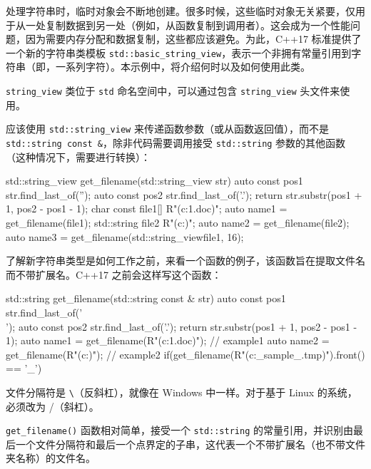 

处理字符串时，临时对象会不断地创建。很多时候，这些临时对象无关紧要，仅用于从一处复制数据到另一处（例如，从函数复制到调用者）。这会成为一个性能问题，因为需要内存分配和数据复制，这些都应该避免。为此，C++17 标准提供了一个新的字符串类模板 \verb|std::basic_string_view|，表示一个非拥有常量引用到字符串（即，一系列字符）。本示例中，将介绍何时以及如何使用此类。


\verb|string_view| 类位于 \verb|std| 命名空间中，可以通过包含 \verb|string_view| 头文件来使用。


应该使用 \verb|std::string_view| 来传递函数参数（或从函数返回值），而不是 \verb|std::string const &|，除非代码需要调用接受 \verb|std::string| 参数的其他函数（这种情况下，需要进行转换）：

\begin{cpp}
std::string_view get_filename(std::string_view str)
{
    auto const pos1 {str.find_last_of('')};
    auto const pos2 {str.find_last_of('.')};
    return str.substr(pos1 + 1, pos2 - pos1 - 1);
}
char const file1[] {R"(c:\test\example1.doc)"};
auto name1 = get_filename(file1);
std::string file2 {R"(c:\test{})"};
auto name2 = get_filename(file2);
auto name3 = get_filename(std::string_view{file1, 16});
\end{cpp}


了解新字符串类型是如何工作之前，来看一个函数的例子，该函数旨在提取文件名而不带扩展名。C++17 之前会这样写这个函数：

\begin{cpp}
std::string get_filename(std::string const & str)
{
    auto const pos1 {str.find_last_of('\\')};
    auto const pos2 {str.find_last_of('.')};
    return str.substr(pos1 + 1, pos2 - pos1 - 1);
}
auto name1 = get_filename(R"(c:\test\example1.doc)"); // example1
auto name2 = get_filename(R"(c:\test{})");     // example2
if(get_filename(R"(c:\test\_sample_.tmp)").front() == '_') {}
\end{cpp}

\begin{myNotic}
文件分隔符是 \verb|\|（反斜杠），就像在 Windows 中一样。对于基于 Linux 的系统，必须改为 /（斜杠）。
\end{myNotic}

\verb|get_filename()| 函数相对简单，接受一个 \verb|std::string| 的常量引用，并识别由最后一个文件分隔符和最后一个点界定的子串，这代表一个不带扩展名（也不带文件夹名称）的文件名。

